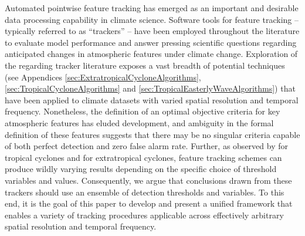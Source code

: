 \documentclass[gmdd, hvmath, online]{copernicus_discussions}
\begin{document}



\introduction  %

Automated pointwise feature tracking has emerged as an important and desirable data processing capability in climate science.  Software tools for feature tracking -- typically referred to as ``trackers'' -- have been employed throughout the literature to evaluate model performance and answer pressing scientific questions regarding anticipated changes in atmospheric features under climate change.  Exploration of the regarding tracker literature exposes a vast breadth of potential techniques (see Appendices \ref{sec:ExtratropicalCycloneAlgorithms}, \ref{sec:TropicalCycloneAlgorithms} and \ref{sec:TropicalEasterlyWaveAlgorithms}) that have been applied to climate datasets with varied spatial resolution and temporal frequency.  Nonetheless, the definition of an optimal objective criteria for key atmospheric features has eluded development, and ambiguity in the formal definition of these features suggests that there may be no singular criteria capable of both perfect detection and zero false alarm rate.  Further, as observed by \cite{walsh2007objectively} for tropical cyclones and \cite{neu2013imilast} for extratropical cyclones, feature tracking schemes can produce wildly varying results depending on the specific choice of threshold variables and values.  Consequently, we argue that conclusions drawn from these trackers should use an ensemble of detection thresholds and variables.  To this end, it is the goal of this paper to develop and present a unified framework that enables a variety of tracking procedures applicable across effectively arbitrary spatial resolution and temporal frequency.
\end{document}
